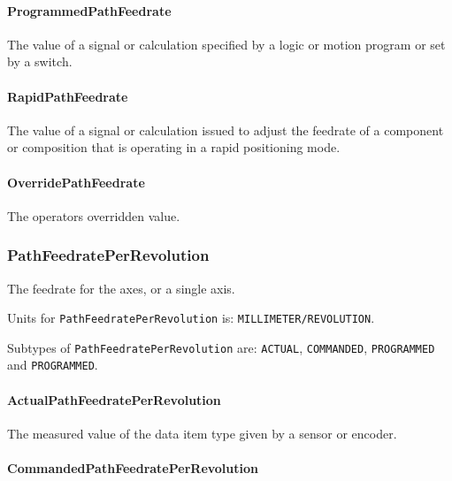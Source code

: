 \paragraph{ProgrammedPathFeedrate}\mbox{}
\label{sec:ProgrammedPathFeedrate}



The value of a signal or calculation specified by a logic or motion program or set by a switch.


\paragraph{RapidPathFeedrate}\mbox{}
\label{sec:RapidPathFeedrate}



The value of a signal or calculation issued to adjust the feedrate of a component or composition that is operating in a rapid positioning mode.


\paragraph{OverridePathFeedrate}\mbox{}
\label{sec:OverridePathFeedrate}



The operators overridden value.


\subsubsection{PathFeedratePerRevolution}
\label{sec:PathFeedratePerRevolution}



The feedrate for the axes, or a single axis.


Units for \texttt{PathFeedratePerRevolution} is: \texttt{MILLIMETER/REVOLUTION}.


Subtypes of \texttt{PathFeedratePerRevolution} are: \texttt{ACTUAL}, \texttt{COMMANDED}, \texttt{PROGRAMMED} and \texttt{PROGRAMMED}. 
\FloatBarrier

\paragraph{ActualPathFeedratePerRevolution}\mbox{}
\label{sec:ActualPathFeedratePerRevolution}



The measured value of the data item type given by a sensor or encoder.


\paragraph{CommandedPathFeedratePerRevolution}\mbox{}
\label{sec:CommandedPathFeedratePerRevolution}



